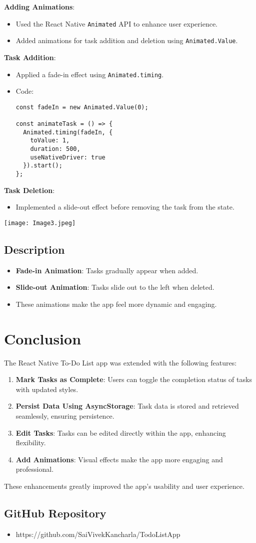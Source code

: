 \documentclass[12pt]{article}
\begin{document}
\textbf{Adding Animations}:
\begin{itemize}
    \item Used the React Native \texttt{Animated} API to enhance user experience.
    \item Added animations for task addition and deletion using \texttt{Animated.Value}.
\end{itemize}

\textbf{Task Addition}:
\begin{itemize}
    \item Applied a fade-in effect using \texttt{Animated.timing}.
    \item Code:
    \begin{verbatim}
const fadeIn = new Animated.Value(0);

const animateTask = () => {
  Animated.timing(fadeIn, {
    toValue: 1,
    duration: 500,
    useNativeDriver: true
  }).start();
};
    \end{verbatim}
\end{itemize}

\textbf{Task Deletion}:
\begin{itemize}
    \item Implemented a slide-out effect before removing the task from the state.
\end{itemize}
\texttt{[image: Image3.jpeg]}



\subsection{Description}
\begin{itemize}
    \item \textbf{Fade-in Animation}: Tasks gradually appear when added.
    \item \textbf{Slide-out Animation}: Tasks slide out to the left when deleted.
    \item These animations make the app feel more dynamic and engaging.
\end{itemize}

\section{Conclusion}
The React Native To-Do List app was extended with the following features:
\begin{enumerate}
    \item \textbf{Mark Tasks as Complete}: Users can toggle the completion status of tasks with updated styles.
    \item \textbf{Persist Data Using AsyncStorage}: Task data is stored and retrieved seamlessly, ensuring persistence.
    \item \textbf{Edit Tasks}: Tasks can be edited directly within the app, enhancing flexibility.
    \item \textbf{Add Animations}: Visual effects make the app more engaging and professional.
\end{enumerate}

These enhancements greatly improved the app's usability and user experience.


\subsection*{ GitHub Repository}
\begin{itemize}
    \item https://github.com/SaiVivekKancharla/TodoListApp
\end{itemize}
\end{document}
